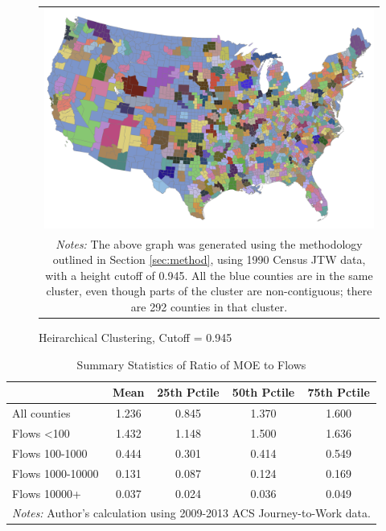 \begin{figure}[th]
\caption{Heirarchical Clustering, Cutoff = 0.945 \label{fig:highcutoff}}
\begin{tabular}{c}
\includegraphics[scale=0.3]{./figures/jtw1990_highcutoff.png}  \\
\multicolumn{1}{p{5in}}{\footnotesize \emph{Notes:} The above graph was generated using the methodology outlined in Section \ref{sec:method}, using 1990 Census JTW data, with a height cutoff of 0.945. All the blue counties are in the same cluster, even though parts of the cluster are non-contiguous; there are 292 counties in that cluster.}
\end{tabular}
\end{figure}

\begin{table}[h]
\caption{Summary Statistics of Ratio of MOE to Flows \label{tab:moesum}}
\begin{tabular}{lcccc}
\hline\hline
& Mean & 25th Pctile & 50th Pctile & 75th Pctile \\
\hline
All counties & 1.236 & 0.845 & 1.370 & 1.600\\
Flows <100 & 1.432 & 1.148 & 1.500 & 1.636 \\
Flows 100-1000 & 0.444 & 0.301 & 0.414 & 0.549  \\
Flows 1000-10000 & 0.131 & 0.087 & 0.124 & 0.169 \\
Flows 10000+ & 0.037 & 0.024 & 0.036 & 0.049 \\
\hline\hline
\multicolumn{5}{p{4in}}{\footnotesize \emph{Notes:} Author's calculation using
2009-2013 ACS Journey-to-Work data.}
\end{tabular}
\end{table}

